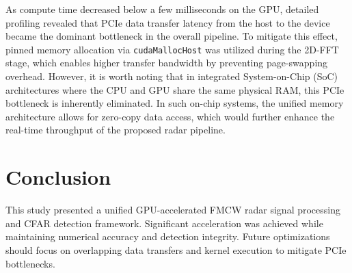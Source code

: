 \documentclass[conference, a4paper]{IEEEtran}
\begin{document}
As compute time decreased below a few milliseconds on the GPU, detailed profiling revealed that PCIe data transfer latency from the host to the device became the dominant bottleneck in the overall pipeline. To mitigate this effect, pinned memory allocation via \texttt{cudaMallocHost} was utilized during the 2D-FFT stage, which enables higher transfer bandwidth by preventing page-swapping overhead. However, it is worth noting that in integrated System-on-Chip (SoC) architectures where the CPU and GPU share the same physical RAM, this PCIe bottleneck is inherently eliminated. In such on-chip systems, the unified memory architecture allows for zero-copy data access, which would further enhance the real-time throughput of the proposed radar pipeline.

\FloatBarrier

\section{Conclusion}

This study presented a unified GPU-accelerated FMCW radar signal processing and CFAR detection framework.
Significant acceleration was achieved while maintaining numerical accuracy and detection integrity.
Future optimizations should focus on overlapping data transfers and kernel execution to mitigate PCIe bottlenecks.




\end{document}
